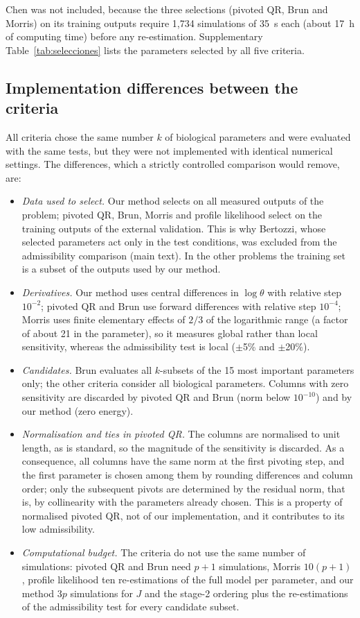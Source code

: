 Chen was not included, because the three selections (pivoted QR, Brun and Morris) on its training outputs require 1,734 simulations of 35~s each (about 17~h of computing time) before any re-estimation. Supplementary Table~\ref{tab:selecciones} lists the parameters selected by all five criteria.

\subsection*{Implementation differences between the criteria}
All criteria chose the same number $k$ of biological parameters and were evaluated with the same tests, but they were not implemented with identical numerical settings. The differences, which a strictly controlled comparison would remove, are:
\begin{itemize}\itemsep0pt
\item \emph{Data used to select.} Our method selects on all measured outputs of the problem; pivoted QR, Brun, Morris and profile likelihood select on the training outputs of the external validation. This is why Bertozzi, whose selected parameters act only in the test conditions, was excluded from the admissibility comparison (main text). In the other problems the training set is a subset of the outputs used by our method.
\item \emph{Derivatives.} Our method uses central differences in $\log\theta$ with relative step $10^{-2}$; pivoted QR and Brun use forward differences with relative step $10^{-4}$; Morris uses finite elementary effects of $2/3$ of the logarithmic range (a factor of about 21 in the parameter), so it measures global rather than local sensitivity, whereas the admissibility test is local ($\pm$5\% and $\pm$20\%).
\item \emph{Candidates.} Brun evaluates all $k$-subsets of the 15 most important parameters only; the other criteria consider all biological parameters. Columns with zero sensitivity are discarded by pivoted QR and Brun (norm below $10^{-10}$) and by our method (zero energy).
\item \emph{Normalisation and ties in pivoted QR.} The columns are normalised to unit length, as is standard, so the magnitude of the sensitivity is discarded. As a consequence, all columns have the same norm at the first pivoting step, and the first parameter is chosen among them by rounding differences and column order; only the subsequent pivots are determined by the residual norm, that is, by collinearity with the parameters already chosen. This is a property of normalised pivoted QR, not of our implementation, and it contributes to its low admissibility.
\item \emph{Computational budget.} The criteria do not use the same number of simulations: pivoted QR and Brun need $p+1$ simulations, Morris $10(p+1)$, profile likelihood ten re-estimations of the full model per parameter, and our method $3p$ simulations for $J$ and the stage-2 ordering plus the re-estimations of the admissibility test for every candidate subset.
\end{itemize}
